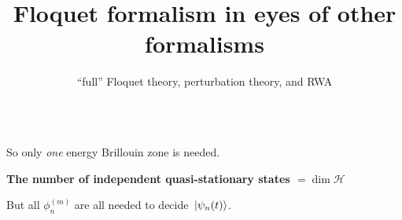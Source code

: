 \documentclass[t]{beamer}
\begin{document}
\begin{frame}
\begin{columns}
\begin{column}{0.39\textwidth}
\begin{minipage}{\columnwidth}
{               
        }
    \end{minipage}
\end{column}

\end{columns}

\vspace{0.5cm}

So only \emph{one} energy Brillouin zone is needed.

\textbf{The number of independent quasi-stationary states $= \dim \mathcal{H}$}

\vspace{0.5cm}

But all $\phi_n^{(m)}$ are all needed to decide $\ket*{\psi_n(t)}$.

\end{frame}

\endgroup

\begingroup

\title{Floquet formalism in eyes of other formalisms}
\subtitle{``full'' Floquet theory, perturbation theory, and RWA}
\author{}
\date{}

\begin{frame}
    \titlepage
\end{frame}
\end{document}
